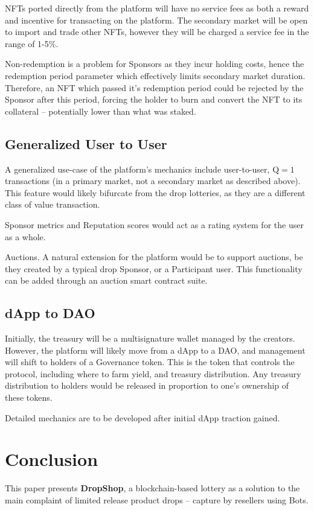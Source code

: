 \documentclass[runningheads]{llncs}
\begin{document}
NFTs ported directly from the platform will have no service fees as both a reward and incentive for transacting on the platform.  The secondary market will be open to import and trade other NFTs, however they will be charged a service fee in the range of 1-5\%.

Non-redemption is a problem for Sponsors as they incur holding costs, hence the redemption period parameter which effectively limits secondary market duration.  Therefore, an NFT which passed it’s redemption period could be rejected by the Sponsor after this period, forcing the holder to burn and convert the NFT to its collateral – potentially lower than what was staked.

\subsection{Generalized User to User}
A generalized use-case of the platform’s mechanics include user-to-user, $\mathrm{Q} = 1$ transactions (in a primary market, not a secondary market as described above).    This feature would likely bifurcate from the drop lotteries, as they are a different class of value transaction.  

Sponsor metrics and Reputation scores would act as a rating system for the user as a whole.  

Auctions.  A natural extension for the platform would be to support auctions, be they created by a typical drop Sponsor, or a Participant user.  This functionality can be added through an auction smart contract suite.

\subsection{dApp to DAO}
Initially, the treasury will be a multisignature wallet managed by the creators.  However, the platform will likely move from a dApp to a DAO, and management will shift to holders of a Governance token.  This is the token that controls the protocol, including where to farm yield, and treasury distribution.  Any treasury distribution to holders would be released in proportion to one’s ownership of these tokens. 

Detailed mechanics are to be developed after initial dApp traction gained.


\section{Conclusion}
This paper presents \textbf{DropShop}, a blockchain-based lottery as a solution to the main complaint of limited release product drops – capture by resellers using Bots.
\end{document}
